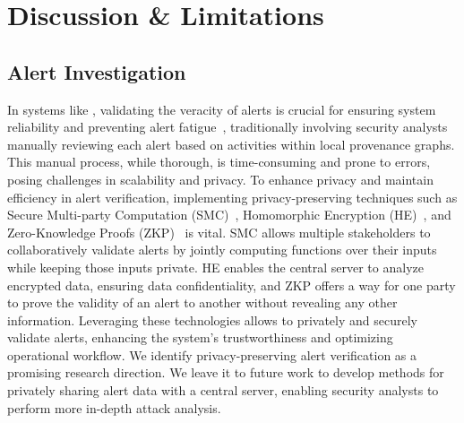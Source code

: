 \section{Discussion \& Limitations}
\label{sec:discussion}






\subsection{Alert Investigation} In systems like \Sys, validating the veracity of alerts is crucial for ensuring system reliability and preventing alert fatigue~\cite{nodoze2019}, traditionally involving security analysts manually reviewing each alert based on activities within local provenance graphs. This manual process, while thorough, is time-consuming and prone to errors, posing challenges in scalability and privacy. To enhance privacy and maintain efficiency in alert verification, implementing privacy-preserving techniques such as Secure Multi-party Computation (SMC)~\cite{goldreich1998secure}, Homomorphic Encryption (HE)~\cite{yi2014homomorphic}, and Zero-Knowledge Proofs (ZKP)~\cite{fiege1987zero} is vital. SMC allows multiple stakeholders to collaboratively validate alerts by jointly computing functions over their inputs while keeping those inputs private. HE enables the central server to analyze encrypted data, ensuring data confidentiality, and ZKP offers a way for one party to prove the validity of an alert to another without revealing any other information. Leveraging these technologies allows \Sys to privately and securely validate alerts, enhancing the system's trustworthiness and optimizing operational workflow. We identify privacy-preserving alert verification as a promising research direction. We leave it to future work to develop methods for privately sharing alert data with a central server, enabling security analysts to perform more in-depth attack analysis.

